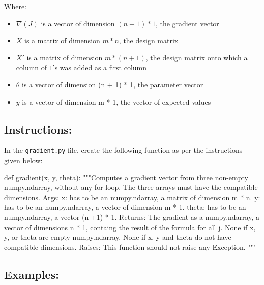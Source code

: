 \documentclass[]{article}
\newenvironment{Shaded}{\begin{snugshade}}{\end{snugshade}}
\newcommand{\CommentTok}[1]{\textcolor[rgb]{0.48,0.49,0.49}{#1}}
\newcommand{\KeywordTok}[1]{\textcolor[rgb]{0.81,0.81,0.76}{#1}}
\newcommand{\NormalTok}[1]{\textcolor[rgb]{0.81,0.81,0.76}{#1}}
\begin{document}
Where:

\begin{itemize}
\item
  \(\nabla(J)\) is a vector of dimension \((n + 1) * 1\), the gradient
  vector
\item
  \(X\) is a matrix of dimension \(m * n\), the design matrix
\item
  \(X'\) is a matrix of dimension \(m * (n + 1)\), the design matrix
  onto which a column of \(1\)'s was added as a first column
\item
  \(\theta\) is a vector of dimension (n + 1) * 1, the parameter vector
\item
  \(y\) is a vector of dimension m * 1, the vector of expected values
\end{itemize}

\hypertarget{instructions-4}{%
\subsection{Instructions:}\label{instructions-4}}

In the \texttt{gradient.py} file, create the following function as per
the instructions given below:

\begin{Shaded}
\begin{Highlighting}[]
\KeywordTok{def}\NormalTok{ gradient(x, y, theta):}
    \CommentTok{"""Computes a gradient vector from three non-empty numpy.ndarray, without any for-loop. The three arrays must have the compatible dimensions.}
\CommentTok{    Args:}
\CommentTok{      x: has to be an numpy.ndarray, a matrix of dimension m * n.}
\CommentTok{      y: has to be an numpy.ndarray, a vector of dimension m * 1.}
\CommentTok{      theta: has to be an numpy.ndarray, a vector (n +1) * 1.}
\CommentTok{    Returns:}
\CommentTok{      The gradient as a numpy.ndarray, a vector of dimensions n * 1, containg the result of the formula for all j.}
\CommentTok{      None if x, y, or theta are empty numpy.ndarray.}
\CommentTok{      None if x, y and theta do not have compatible dimensions.}
\CommentTok{    Raises:}
\CommentTok{      This function should not raise any Exception.}
\CommentTok{    """}
\end{Highlighting}
\end{Shaded}

\hypertarget{examples-4}{%
\subsection{Examples:}\label{examples-4}}
\end{document}
